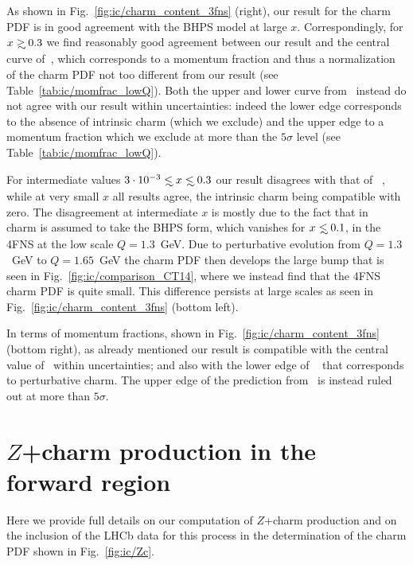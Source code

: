 As shown in Fig.~\ref{fig:ic/charm_content_3fns} (right), our result for
the charm PDF is in good agreement with the BHPS model at large
$x$. Correspondingly, for $x\gsim 0.3$
we find reasonably good agreement between our
result and the central curve of~\cite{Hou:2017khm}, which
corresponds to a momentum fraction and thus a normalization of the charm
PDF not too different from our result (see Table~\ref{tab:ic/momfrac_lowQ}).
%
Both the upper and lower curve from~\cite{Hou:2017khm} instead
do not agree with our result within uncertainties: indeed the
lower edge corresponds to the absence of intrinsic charm (which we
exclude) and the upper edge to a momentum fraction which we exclude
at more than the $5\sigma$ level (see Table~\ref{tab:ic/momfrac_lowQ}). 

For intermediate values $3\cdot10^{-3}\lsim x\lsim 0.3$  our result disagrees
with that of 
~\cite{Hou:2017khm}, while at very small $x$ all results agree,
the intrinsic charm being compatible with zero.
The disagreement at intermediate $x$ is mostly due
to the fact that in ~\cite{Hou:2017khm} charm is assumed to take
the BHPS form, which vanishes for $x\lsim 0.1$,
in the 4FNS at the low scale $Q=1.3$~GeV.
%
Due to perturbative evolution from  $Q=1.3$~GeV to $Q=1.65$~GeV the charm 
PDF then develops the large bump that is
seen in Fig.~\ref{fig:ic/comparison_CT14}, where we instead find that 
the 4FNS charm PDF is quite small.
%
This difference persists at large scales as seen  in
Fig.~\ref{fig:ic/charm_content_3fns} (bottom left).

In terms of momentum fractions, shown in Fig.~\ref{fig:ic/charm_content_3fns} (bottom right),
as already mentioned our result is
compatible with the central value of~\cite{Hou:2017khm} within
uncertainties; and also with the lower edge of ~\cite{Hou:2017khm}
that corresponds to perturbative charm.
%
The upper edge  of the prediction from~\cite{Hou:2017khm} is instead
ruled out at more than $5\sigma$. 


\section{$Z$+charm production in the forward region}
\label{sec:ic/zcharm}

Here we provide full details on our computation of  $Z$+charm
production and on the inclusion of the LHCb data for this
process in the determination of the charm PDF shown in
Fig.~\ref{fig:ic/Zc}. 

